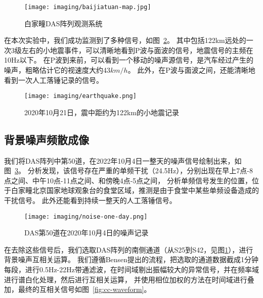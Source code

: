 \begin{figure}[h]
    \centering
    \texttt{[image: imaging/baijiatuan-map.jpg]}
    \caption{白家疃DAS阵列观测系统}
    \label{fig:baijiatuan-map}
\end{figure}


在本次实验中，我们成功监测到了多种信号，如图~\ref{fig:earthquake}。
其中包括122km远处的一次3级左右的小地震事件，可以清晰地看到P波与面波的信号，地震信号的主频在10Hz以下。
在P波到来前，可以看到一个移动的噪声源信号，是汽车经过产生的噪声，粗略估计它的视速度大约43$km/h$。
此外，在P波与面波之间，还能清晰地看到一次人工落锤记录的信号。

\begin{figure}[h]
    \centering
    \texttt{[image: imaging/earthquake.png]}
    \caption{2020年10月21日，震中距约为122km的小地震记录}
    \label{fig:earthquake}
\end{figure}









\subsection{背景噪声频散成像}

我们将DAS阵列中第50道，在2022年10月4日一整天的噪声信号绘制出来，如图~\ref{fig:noise-one-day}。
分析发现，该信号存在严重的单频干扰（24.5Hz），分别出现在早上7点-8点之间、中午10点-11点之间、和傍晚4点-5点之间，
分析单频信号发生的位置，位于白家疃北京国家地球观象台的食堂区域，推测是由于食堂中某些单频设备造成的干扰信号。
此外还能看到持续一整天的人工落锤信号。

\begin{figure}[h]
    \centering
    \texttt{[image: imaging/noise-one-day.png]}
    \caption{DAS第50道在2020年10月4日的噪声记录}
    \label{fig:noise-one-day}
\end{figure}

在去除这些信号后，我们选取DAS阵列的南侧通道（从S25到S42，见图\ref{fig:baijiatuan-map}），进行背景噪声互相关运算。
我们遵循Bensen提出的流程，把选取的通道数据截成1分钟每段，进行0.5Hz-22Hz带通滤波，在时间域剔出振幅较大的异常信号，并在频率域进行谱白化处理，然后进行互相关运算，
并使用相位加权的方法在时间域进行叠加，最终的互相关信号如图~\ref{fig:cc-waveform}。


